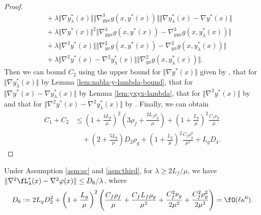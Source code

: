 \begin{proof}
\begin{align*}
    &\quad + \lambda \Vert \nabla y_{\lambda}^*(x) \Vert \Vert \nabla_{yyx}^3 g(x,y^*(x)) \Vert  \Vert \nabla y_{\lambda}^*(x) - \nabla y^*(x) \Vert \\
    &\quad + \lambda \Vert \nabla y^*(x) \Vert^2 \Vert \nabla_{yyx}^3 g(x,y^*(x)) - \nabla_{yyx}^3 g(x,y_{\lambda}^*(x)) \Vert \\
    &\quad + \lambda \Vert \nabla^2 y^*(x) \Vert \Vert \nabla_{yx}^2 g(x,y^*(x)) - \nabla_{yx}^2 g(x,y_{\lambda}^*(x)) \Vert \\
    &\quad + \lambda \Vert \nabla^2 y^*(x) - \nabla^2 y_{\lambda}^*(x) \Vert  \Vert \nabla_{yx}^2 g(x,y_{\lambda}^*(x)) \Vert.
\end{align*}
Then we can bound $C_2$ using the upper bound for
$\Vert \nabla y^*(x) \Vert$ given by , that for 
$\Vert \nabla y_{\lambda}^*(x) \Vert$ by Lemma \ref{lem:nabla-y-lambda-bound}, that for $ \Vert \nabla y^*(x) - \nabla y_{\lambda}^*(x) \Vert$ by Lemma \ref{lem:yxyx-lambda}, that for $ \Vert \nabla^2 y^*(x) \Vert$ by  and that for $ \Vert \nabla^2 y^*(x) - \nabla^2 y_{\lambda}^*(x) \Vert$ by . 
Finally, we can obtain 
\begin{align*}
    C_1+C_2 & \le \left( 1 + \frac{4L_g}{\mu} \right)^2 \left( 3\rho_f  + \frac{2 L_f \rho_g}{\mu} \right) + \left(1 + \frac{L_g}{\mu} \right)^2 \frac{C_f \nu_g}{\mu} \\
    &\quad + \left(2+ \frac{5L_g}{\mu} \right) D_2 \rho_g +  \left( 1+ \frac{L_g}{\mu} \right)^2 \frac{C_f \rho_g^2}{\mu^2} + L_g D_4.
\end{align*}
\end{proof}
 
\begin{lem} \label{lem:nabla2-phi}
Under Assumption \ref{asm:sc} and \ref{asm:third}, for $\lambda \ge 2 L_f /\mu$, we have $ \Vert \nabla^2 \fL_{\lambda}^*(x) - \nabla^2 \varphi(x) \Vert \le  D_6 /\lambda$,
where
\begin{align*}
    D_6 := 2L_g D_2^2 + \left( 1 + \frac{L_g}{\mu}\right)^2\left( \frac{C_f \rho_f}{\mu} + \frac{C_f L_f \rho_g}{\mu^2} + \frac{C_f^2 \nu_g}{2 \mu^2} + \frac{C_f^2 \rho_g^2}{2 \mu^3}  \right)  = \fO(\ell \kappa^6).
\end{align*}
\end{lem}

